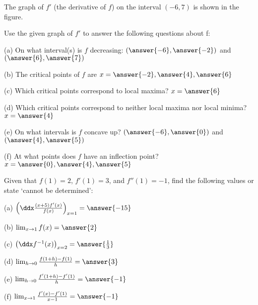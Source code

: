\documentclass{ximera}
\begin{document}
\begin{exercise}
The graph of $f'$ (the derivative of $f$) on the interval $(-6,7)$ is shown in the figure.

\begin{image}
\end{image}



Use the given graph of $f'$ to answer the following questions about f:

(a) On what interval(s) is $f$ decreasing: $(\answer{-6},\answer{-2})$ and $(\answer{6},\answer{7})$

(b) The critical points of $f$ are $x=\answer{-2},\answer{4},\answer{6}$

(c) Which critical points correspond to local maxima? $x=\answer{6}$

(d) Which critical points correspond to neither local maxima nor local minima? $x=\answer{4}$

(e) On what intervals is $f$ concave up? $(\answer{-6},\answer{0})$ and $(\answer{4},\answer{5})$

(f) At what points does $f$ have an inflection point? $x=\answer{0},\answer{4},\answer{5}$
\end{exercise}

\begin{exercise}
Given that $f(1)=2$, $f'(1)=3$, and $f''(1)=-1$, find the following values or state `cannot be determined':

(a) $\left(\ddx\frac{(x+5)f'(x)}{f(x)}\right)_{x=1}=\answer{-15}$

(b) $\lim_{x\to 1}f(x)=\answer{2}$

(c) $\left(\ddx f^{-1}(x)\right)_{x=2}=\answer{\frac{1}{3}}$

(d) $\lim_{h\to 0}\frac{f(1+h)-f(1)}{h}=\answer{3}$

(e) $\lim_{h\to 0} \frac{f'(1+h)-f'(1)}{h}=\answer{-1}$

(f) $\lim_{x \to 1} \frac{f'(x)-f'(1)}{x-1}=\answer{-1}$

\end{exercise}
\end{document}
